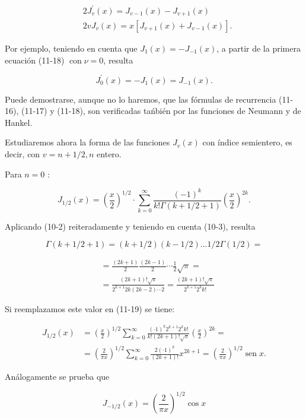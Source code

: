 \documentclass[10pt]{article}
\theoremstyle{plain}
\theoremstyle{definition}
\theoremstyle{remark}
\begin{document}
\begin{align*}
& 2 J_{v}^{\prime}(x)=J_{v-1}(x)-J_{v+1}(x)  \tag{11-18}\\
& 2 v J_{v}(x)=x\left[J_{v+1}(x)+J_{v-1}(x)\right] . \tag{11-18}
\end{align*}


Por ejemplo, teniendo en cuenta que $J_{1}(x)=-J_{-1}(x)$, a partir de la primera ecuación (11-18) $\operatorname{con} \nu=0$, resulta

$$
J_{0}^{\prime}(x)=-J_{1}(x)=J_{-1}(x) .
$$

Puede demostrarse, aunque no lo haremos, que las fórmulas de recurrencia (11-16), (11-17) y (11-18), son verificadas tańbién por las funciones de Neumann y de Hankel.

Estudiaremos ahora la forma de las funciones $J_{v}(x)$ con índice semientero, es decir, con $v=n+1 / 2, n$ entero.

Para $n=0$ :


\begin{equation*}
J_{1 / 2}(x)=\left(\frac{x}{2}\right)^{1 / 2} \cdot \sum_{k=0}^{\infty} \frac{(-1)^{k}}{k!\Gamma(k+1 / 2+1)}\left(\frac{x}{2}\right)^{2 k} . \tag{11-19}
\end{equation*}


Aplicando (10-2) reiteradamente y teniendo en cuenta (10-3), resulta

$$
\Gamma(k+1 / 2+1)=(k+1 / 2)(k-1 / 2) \ldots 1 / 2 \Gamma(1 / 2)=
$$

$$
\begin{aligned}
& =\frac{(2 k+1)}{2} \frac{(2 k-1)}{2} \cdots \frac{1}{2} \sqrt{\pi}= \\
& =\frac{(2 k+1)!\sqrt{\pi}}{2^{k+1} 2 k(2 k-2) \cdots 2}=\frac{(2 k+1)!\sqrt{\pi}}{2^{k+1} 2^{k} k!}
\end{aligned}
$$

Si reemplazamos este valor en (11-19) se tiene:

$$
\begin{aligned}
J_{1 / 2}(x) & =\left(\frac{x}{2}\right)^{1 / 2} \sum_{k=0}^{\infty} \frac{(\cdot 1)^{k} 2^{k+1} 2^{k} k!}{k!(2 k+1)!\sqrt{\pi}}\left(\frac{x}{2}\right)^{2 k}= \\
& =\left(\frac{2}{\pi x}\right)^{1 / 2} \sum_{k=0}^{\infty} \frac{2(\cdot 1)^{k}}{(2 k+1)!} x^{2 k+1}=\left(\frac{2}{\pi x}\right)^{1 / 2} \operatorname{sen} x .
\end{aligned}
$$

Análogamente se prueba que

$$
J_{-1 / 2}(x)=\left(\frac{2}{\pi x}\right)^{1 / 2} \cos x
$$
\end{document}
